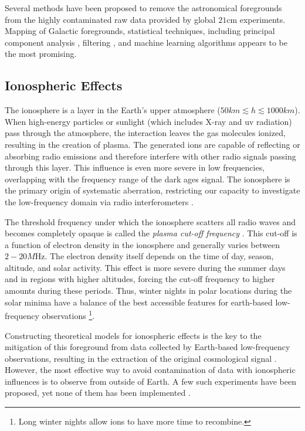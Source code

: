 \documentclass[12pt, TexShade, letterpaper]{report}
\begin{document}
Several methods have been proposed to remove the astronomical foregrounds from the highly contaminated raw data provided by global $\mathrm{21cm}$ experiments. Mapping of Galactic foregrounds, statistical techniques, including principal component analysis \cite{principal_component}, filtering \cite{filtering}, and machine learning algorithms \cite{removal_deep_learning, signal_reconstruction, signal_extraction, extract_foreground, pritchard_mcmc} appears to be the most promising\cite{thesis_pamela}.\par

\subsection{Ionospheric Effects}
The ionosphere is a layer in the Earth's upper atmosphere ($50km \lesssim h \lesssim 1000 km$). When high-energy particles or sunlight (which includes X-ray and \gls{uv} radiation) pass through the atmosphere, the interaction leaves the gas molecules ionized, resulting in the creation of plasma. The generated ions are capable of reflecting or absorbing radio emissions and therefore interfere with other radio signals passing through this layer. This influence is even more severe in low frequencies, overlapping with the frequency range of the dark ages signal. The ionosphere is the primary origin of systematic aberration, restricting our capacity to investigate the low-frequency domain via radio interferometers \cite{thesis_pamela, ionosphere_ultra_low}.\par
The threshold frequency under which the ionosphere scatters all radio waves and becomes completely opaque is called the \emph{plasma cut-off frequency} \cite{ionosphere_effect_book, thesis_pamela}. This cut-off is a function of electron density in the ionosphere and generally varies between $2-20M\mathrm{Hz}$. The electron density itself depends on the time of day, season, altitude, and solar activity. This effect is more severe during the summer days and in regions with higher altitudes, forcing the cut-off frequency to higher amounts during these periods. Thus, winter nights in polar locations during the solar minima have a balance of the best accessible features for earth-based low-frequency observations  \cite{thesis_pamela} \footnote{Long winter nights allow ions to have more time to recombine.}.\par
Constructing theoretical models for ionospheric effects is the key to the mitigation of this foreground from data collected by Earth-based low-frequency observations, resulting in the extraction of the original cosmological signal \cite{ionosphere_model, ionosphere_Bayesian}. However, the most effective way to avoid contamination of data with ionospheric influences is to observe from outside of Earth\cite{thesis_shedding}. A few such experiments have been proposed, yet none of them has been implemented \cite{dare_1, dare_2, 21cm_space_interferometer, lunar_orbit_21cm}. \par
\end{document}

